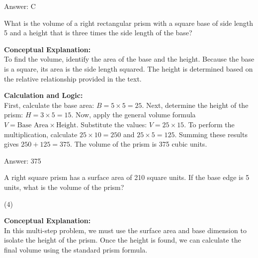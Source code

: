 \documentclass[11pt,paper=a4,answers]{exam}
\begin{document}
\begin{questions}
\begin{solution}
\vspace{30pt}

Answer: \colorbox{yellow!100}{C}
\end{solution}

\vspace{60pt}

\question
What is the volume of a right rectangular prism with a square base of side length 5 and a height that is three times the side length of the base?

\begin{solution}
\textbf{Conceptual Explanation:} \\
To find the volume, identify the area of the base and the height. Because the base is a square, its area is the side length squared. The height is determined based on the relative relationship provided in the text.

\vspace{30pt}

\textbf{Calculation and Logic:} \\
First, calculate the base area: $B = 5 \times 5 = 25$. Next, determine the height of the prism: $H = 3 \times 5 = 15$. Now, apply the general volume formula $V = \text{Base Area} \times \text{Height}$. Substitute the values: $V = 25 \times 15$. To perform the multiplication, calculate $25 \times 10 = 250$ and $25 \times 5 = 125$. Summing these results gives $250 + 125 = 375$. The volume of the prism is 375 cubic units.

\vspace{30pt}

Answer: \colorbox{yellow!100}{375}
\end{solution}

\vspace{60pt}

\question
A right square prism has a surface area of 210 square units. If the base edge is 5 units, what is the volume of the prism?
\begin{tasks}(4)
\end{tasks}

\begin{solution}
\textbf{Conceptual Explanation:} \\
In this multi-step problem, we must use the surface area and base dimension to isolate the height of the prism. Once the height is found, we can calculate the final volume using the standard prism formula.


\end{solution}
\end{questions}
\end{document}
